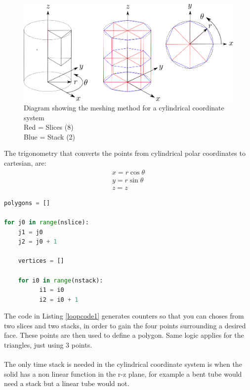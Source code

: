 \documentclass[12pt,a4paper]{article}
\begin{document}
\begin{figure}[h!]
\centering
\includegraphics[scale=0.5]{Images//Coords//cyl.png}
\caption[width=\columnwidth]{Diagram showing the meshing method for a cylindrical coordinate system\\
Red = Slices (8)\\
Blue = Stack (2)}
\label{cylmeshin}
\end{figure}

The trigonometry that converts the points from cylindrical polar coordinates to cartesian, are:
\begin{equation}
\begin{split}
x = r \cos{\theta} \\
y = r \sin{\theta} \\
z = z
\end{split}
\end{equation}

\label{loopcode1} 
\begin{lstlisting}[language=Python, caption=Python example]
polygons = []

for j0 in range(nslice):
    j1 = j0
    j2 = j0 + 1
    
    vertices = []

    for i0 in range(nstack):
          i1 = i0
          i2 = i0 + 1     

\end{lstlisting}
The code in Listing \ref{loopcode1} generates counters so that you can choses from two slices and two stacks, in order to gain the four points surrounding a desired face. These points are then used to define a polygon. Same logic applies for the triangles, just using 3 points.
\\\\
The only time stack is needed in the cylindrical coordinate system is when the solid has a non linear function in the r-z plane, for example a bent tube would need a stack but a linear tube would not.
\end{document}
